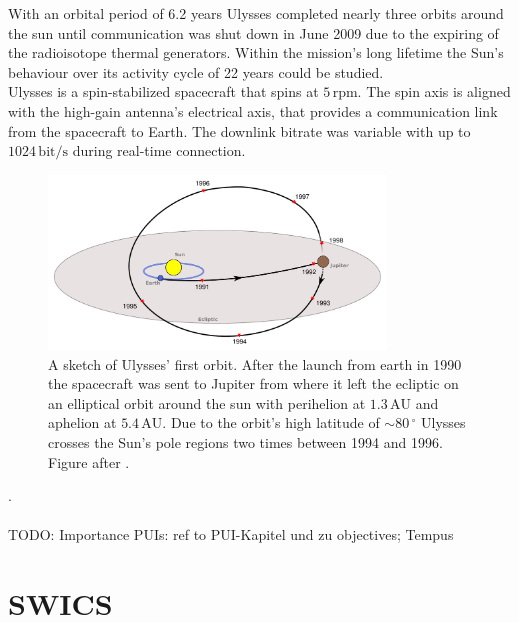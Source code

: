 With an orbital period of 6.2 years Ulysses completed nearly three orbits around the sun until communication was shut down in June 2009 due to the expiring of the radioisotope thermal generators.
Within the mission's long lifetime the Sun's behaviour over its activity cycle of 22 years could be studied.\\
Ulysses is a spin-stabilized spacecraft that spins at $5\,\mathrm{rpm}$. The spin axis is aligned with the high-gain antenna's electrical axis, that provides a communication link from the spacecraft to Earth. The downlink bitrate was variable with up to $1024\,\mathrm{bit/s}$ during real-time connection.
\begin{figure}[h]
	\includegraphics[width=0.8\textwidth]{Figures/ulysses_trajectory.pdf}
	\centering
	\caption{A sketch of Ulysses' first orbit. After the launch from earth in 1990 the spacecraft was sent to Jupiter from where it left the ecliptic on an elliptical orbit around the sun with perihelion at $1.3\,\mathrm{AU}$ and aphelion at $5.4\,\mathrm{AU}$. Due to the orbit's high latitude of $\sim 80 \, ^\circ$ Ulysses crosses the Sun's pole regions two times between 1994 and 1996. Figure after \citet{esa_orbit}.}
	\label{fig:trajectory}
\end{figure}
.
\\ \\ 
TODO: Importance PUIs: ref to PUI-Kapitel und zu objectives; Tempus
%
%
%
%
%
\section{SWICS}

